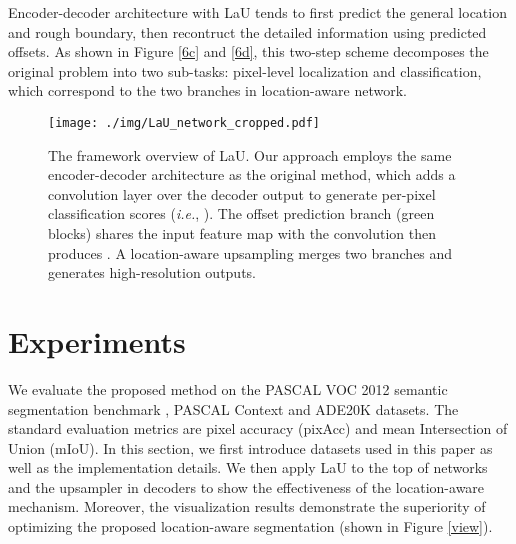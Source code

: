 \documentclass[10pt,twocolumn,letterpaper]{article}
\begin{document}
Encoder-decoder architecture with LaU tends to first predict the general location and rough boundary, then recontruct the detailed information using predicted offsets. As shown in Figure \ref{6c} and \ref{6d}, this two-step scheme decomposes the original problem into two sub-tasks: pixel-level localization and classification, which correspond to the two branches in location-aware network.

\begin{figure}
  \centering
  \texttt{[image: ./img/LaU\_network\_cropped.pdf]} 
  \caption{The framework overview of LaU. Our approach employs the same encoder-decoder architecture as the original method, which adds a  convolution layer over the decoder output to generate per-pixel classification scores (\textit{i.e.}, ). The offset prediction branch (green blocks) shares the input feature map with the  convolution then produces . A location-aware upsampling merges two branches and generates high-resolution outputs.  }
\label{LaU_framework}
\end{figure}

\section{Experiments}
We evaluate the proposed method on the PASCAL VOC 2012 semantic segmentation benchmark \cite{EveringhamGWWZ10}, PASCAL Context \cite{MottaghiCLCLFUY14} and ADE20K \cite{ADE20K} datasets. The standard evaluation metrics are pixel accuracy  (pixAcc) and mean Intersection of Union (mIoU). In this section, we first introduce datasets used in this paper as well as the implementation details. We then apply LaU to the top of networks and the upsampler in decoders to show the effectiveness of the location-aware mechanism. Moreover, the visualization results demonstrate the superiority of optimizing the proposed location-aware segmentation (shown in Figure \ref{view}). 
\end{document}
